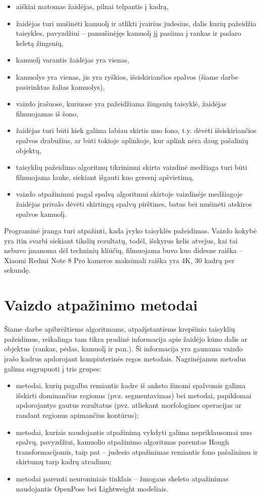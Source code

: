 \documentclass{VUMIFPSbakalaurinis}
\begin{document}
\begin{itemize}
	\item aiškiai matomas žaidėjas, pilnai telpantis į kadrą,
	\item žaidėjas turi mušinėti kamuolį ir atlikti įvairius judesius, dalis kurių pažeidžia taisykles, pavyzdžiui – pamušinėjęs kamuolį jį pasiima į rankas ir padaro keletą žingsnių,
	\item kamuolį varantis žaidėjas yra vienas, 
	\item kamuolys yra vienas, jis yra ryškios, išsiskiriančios spalvos (šiame darbe pasirinktas žalias kamuolys), 
	\item vaizdo įrašuose, kuriuose yra pažeidžiama žingsnių taisyklė, žaidėjas filmuojamas iš šono,
	\item žaidėjas turi būti kiek galima labiau skirtis nuo fono, t.y. dėvėti išsiskiriančios spalvos drabužius, ar būti tokioje aplinkoje, kur aplink nėra daug pašalinių objektų,
	\item taisyklių pažeidimo algoritmų tikrinimui skirta vaizdinė medžiaga turi būti filmuojama lauke, siekiant išgauti kuo geresnį apšvietimą, 
	\item vaizdo atpažinimui pagal spalvą algoritmui skirtoje vaizdinėje medžiagoje žaidėjas privalo dėvėti skirtingų spalvų pirštines, batus bei mušinėti atskiros spalvos kamuolį.
\end{itemize}

Programinė įranga turi atpažinti, kada įvyko taisyklės pažeidimas. Vaizdo kokybė yra itin svarbi siekiant tikslių rezultatų, todėl, išskyrus kelis atvejus, kai tai nebuvo įmanoma dėl techninių kliūčių, filmuojama buvo kuo didesne raiška – Xiaomi Redmi Note 8 Pro kameros maksimali raiška yra 4K, 30 kadrų per sekundę. 

\section{Vaizdo atpažinimo metodai}

Šiame darbe apibrėžtiems algoritmams, atpažįstantiems krepšinio taisyklių pažeidimus, reikalinga tam tikra pradinė informacija apie žaidėjo kūno dalis ar objektus (rankas, pėdas, kamuolį ir pan.). Ši informacija yra gaunama vaizdo įrašo kadrus apdorojant kompiuterinės regos metodais. 
Nagrinėjamus metodus galima sugrupuoti į tris grupes: 

\begin{itemize}
	\item metodai, kurių pagalba remiantis kadre iš anksto žinomi spalvomis galima išskirti dominančius regionus (pvz. segmentavimas) bei metodai, papildomai apdorojantys gautus rezultatus (pvz. atliekant morfologines operacijas ar randant regionus apimančius kontūrus);
	\item metodai, kuriais naudojantis atpažinimą vykdyti galima nepriklausomai nuo spalvų, pavyzdžiui, kamuolio atpažinimo algoritmas paremtas Hough transformacijomis, taip pat – judesio atpažinimas remiantis fono pašalinimu ir skirtumų tarp kadrų atradimu;
	\item metodai paremti neuroniniais tinklais – žmogaus skeleto atpažinimas naudojantis OpenPose bei Lightweight modeliais. 
\end{itemize}
\end{document}
